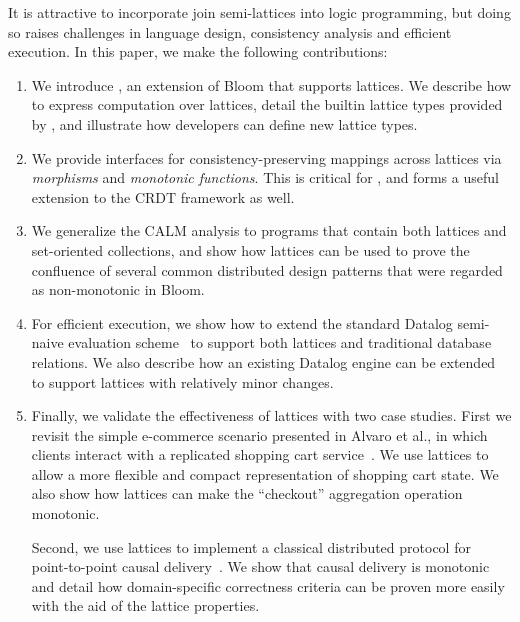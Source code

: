 It is attractive to incorporate join semi-lattices into logic programming,  but doing so raises challenges in language design, consistency analysis and efficient execution.  In this paper, we make the following contributions:
\begin{enumerate}

\item
  We introduce \lang, an extension of Bloom that supports lattices. We describe
  how to express computation over lattices, detail the builtin lattice types
  provided by \lang, and illustrate how developers can define new lattice
  types.
  
\item 
  We provide interfaces for consistency-preserving mappings across lattices via \emph{morphisms} and \emph{monotonic functions}.  This is critical for \lang, and forms a useful extension to the CRDT framework as well.

\item 
  We generalize the CALM analysis to programs that contain both lattices and
  set-oriented collections, and show how lattices can be used to prove the
  confluence of several common distributed design patterns that were regarded as
  non-monotonic in Bloom. %

\item
  For efficient execution, we show how to extend the standard Datalog semi-naive evaluation
  scheme~\cite{Balbin1987} to support both lattices and traditional database
  relations. We also describe how an existing Datalog engine can be extended to
  support lattices with relatively minor changes.

\item
  Finally, we validate the effectiveness of lattices with two case studies. First we
  revisit the simple e-commerce scenario presented in Alvaro et al., in which
  clients interact with a replicated shopping cart service~\cite{Alvaro2011}. We
  use lattices to allow a more flexible and compact representation of shopping
  cart state. We also show how lattices can make the ``checkout'' aggregation
  operation monotonic.

  Second, we use lattices to implement a classical distributed protocol for
  point-to-point causal delivery~\cite{Schiper1989}. We show that causal
  delivery is monotonic and detail how domain-specific correctness criteria can
  be proven more easily with the aid of the lattice properties.
\end{enumerate}

